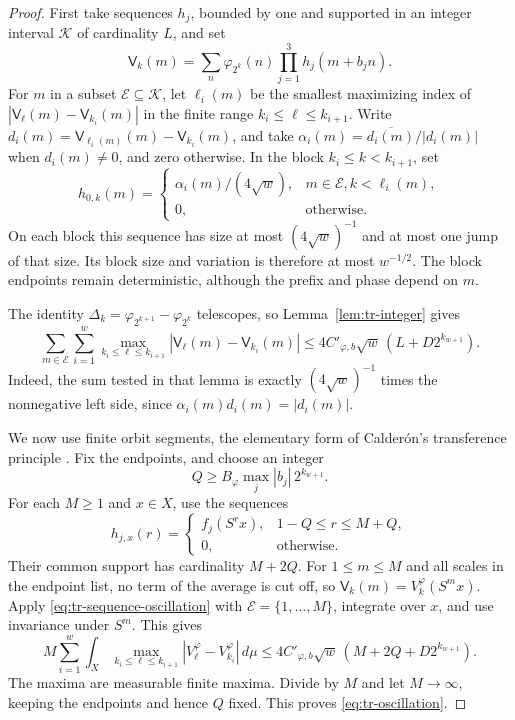 \begin{proof}
First take sequences \(h_j\), bounded by one and supported in an
integer interval \(\mathcal K\) of cardinality \(L\), and set
\[
 \mathsf V_k(m)=\sum_n\varphi_{2^k}(n)
                   \prod_{j=1}^3h_j(m+b_jn).
\]
For \(m\) in a subset \(\mathcal E\subseteq\mathcal K\), let
\(\ell_i(m)\) be the smallest maximizing index of
\(|\mathsf V_\ell(m)-\mathsf V_{k_i}(m)|\) in the finite range
\(k_i\leq\ell\leq k_{i+1}\).  Write
\(d_i(m)=\mathsf V_{\ell_i(m)}(m)-\mathsf V_{k_i}(m)\), and take
\(\alpha_i(m)=\overline{d_i(m)}/|d_i(m)|\) when \(d_i(m)\ne0\),
and zero otherwise.  In the block \(k_i\leq k<k_{i+1}\), set
\[
 h_{0,k}(m)=
 \begin{cases}
  \alpha_i(m)/(4\sqrt w),&m\in\mathcal E, k<\ell_i(m),\\
  0,&\text{otherwise}.
 \end{cases}
\]
On each block this sequence has size at most \((4\sqrt w)^{-1}\)
and at most one jump of that size.  Its block size and variation is
therefore at most \(w^{-1/2}\).  The block endpoints remain
deterministic, although the prefix and phase depend on \(m\).

The identity \(\Delta_k=\varphi_{2^{k+1}}-\varphi_{2^k}\)
telescopes, so Lemma~\ref{lem:tr-integer} gives
\begin{equation}
 \sum_{m\in\mathcal E}\sum_{i=1}^w
  \max_{k_i\leq\ell\leq k_{i+1}}
       |\mathsf V_\ell(m)-\mathsf V_{k_i}(m)|
 \leq4C'_{\varphi,b}\sqrt w\,(L+D2^{k_{w+1}}).
 \label{eq:tr-sequence-oscillation}
\end{equation}
Indeed, the sum tested in that lemma is exactly \((4\sqrt w)^{-1}\)
times the nonnegative left side, since \(\alpha_i(m)d_i(m)=|d_i(m)|\).

We now use finite orbit segments, the elementary form of Calder\'on's
transference principle \cite{Calderon}.  Fix the endpoints, and choose
an integer
\[
 Q\geq B_\varphi\max_j|b_j|\,2^{k_{w+1}}.
\]
For each \(M\geq1\) and \(x\in X\), use the sequences
\[
 h_{j,x}(r)=
 \begin{cases}
  f_j(S^rx),&1-Q\leq r\leq M+Q,\\
  0,&\text{otherwise}.
 \end{cases}
\]
Their common support has cardinality \(M+2Q\).  For
\(1\leq m\leq M\) and all scales in the endpoint list, no term
of the average is cut off, so
\(\mathsf V_k(m)=V_k^\varphi(S^mx)\).  Apply
\eqref{eq:tr-sequence-oscillation} with
\(\mathcal E=\{1,\ldots,M\}\), integrate over \(x\), and use
invariance under \(S^m\).  This gives
\[
 M\sum_{i=1}^w\int_X
  \max_{k_i\leq\ell\leq k_{i+1}}
       |V_\ell^\varphi-V_{k_i}^\varphi|\,d\mu
 \leq4C'_{\varphi,b}\sqrt w\,(M+2Q+D2^{k_{w+1}}).
\]
The maxima are measurable finite maxima.  Divide by \(M\) and let
\(M\to\infty\), keeping the endpoints and hence \(Q\) fixed.
This proves \eqref{eq:tr-oscillation}.
\end{proof}

